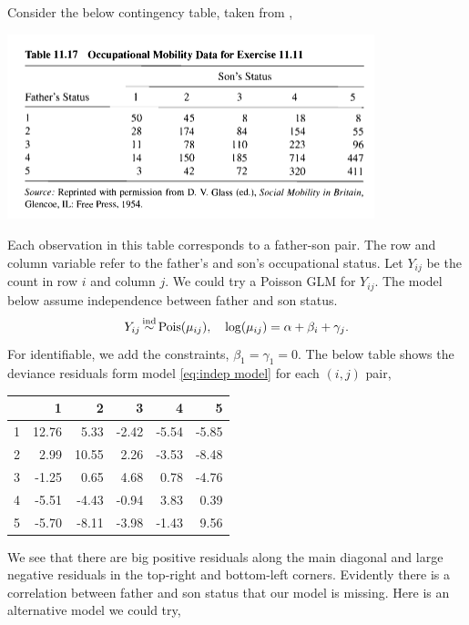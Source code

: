 \begin{example}
    Consider the below contingency table, taken from \citep*{agresti2013categorical},
    \begin{center}
        \includegraphics*[width = 0.8\textwidth]{figures/Agresti-table.png}
    \end{center} 
    Each observation in this table corresponds to a father-son pair. The row and column variable refer to the father's and son's occupational status. Let $Y_{ij}$ be the count in row $i$ and column $j$. We could try a Poisson GLM for $Y_{ij}$. The model below assume independence between father and son status.
    \begin{equation}Y_{ij} \simind \mathrm{Pois}(\mu_{ij}), \quad \log(\mu_{ij}) = \alpha + \beta_i + \gamma_j.  \label{eq:indep model}\end{equation}
    For identifiable, we add the constraints, $\beta_1 =\gamma_1=0$. The below table shows the deviance residuals form model \eqref{eq:indep model} for each $(i,j)$ pair,
    \begin{table}[ht]
        \centering
        \begin{tabular}{|r|rrrrr|}
          \hline
         & 1 & 2 & 3 & 4 & 5 \\ 
          \hline
        1 & 12.76 & 5.33 & -2.42 & -5.54 & -5.85 \\ 
          2 & 2.99 & 10.55 & 2.26 & -3.53 & -8.48 \\ 
          3 & -1.25 & 0.65 & 4.68 & 0.78 & -4.76 \\ 
          4 & -5.51 & -4.43 & -0.94 & 3.83 & 0.39 \\ 
          5 & -5.70 & -8.11 & -3.98 & -1.43 & 9.56 \\ 
           \hline
        \end{tabular}
        \end{table}  
        We see that there are big positive residuals along the main diagonal and large negative residuals in the top-right and bottom-left corners. Evidently there is a correlation between father and son status that our model is missing. Here is an alternative model we could try,

\end{example}
